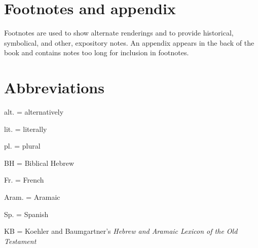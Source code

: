 \section*{Footnotes and appendix}
Footnotes are used to show alternate renderings and to provide historical, symbolical, and other, expository notes. An appendix appears in the back of the book and contains notes too long for inclusion in footnotes.

\section*{Abbreviations}
alt. = alternatively

lit. = literally %

pl. = plural

BH = Biblical Hebrew

Fr. = French

Aram. = Aramaic

Sp. = Spanish

KB = Koehler and Baumgartner's \textit{Hebrew and Aramaic Lexicon of the Old Testament}
